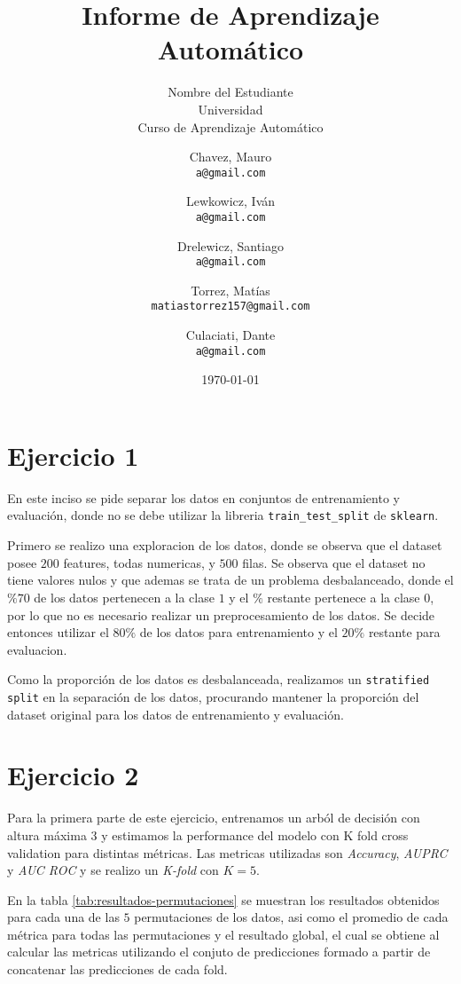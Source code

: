 \documentclass[12pt,a4paper]{article}
\title{Informe de Aprendizaje Automático}
\author{Nombre del Estudiante \\ Universidad \\ Curso de Aprendizaje Automático}
\author{
    Chavez, Mauro \\
    \texttt{a@gmail.com}
    \and
    Lewkowicz, Iván \\
    \texttt{a@gmail.com}
    \and
    Drelewicz, Santiago \\
    \texttt{a@gmail.com}
    \and
    Torrez, Matías \\
    \texttt{matiastorrez157@gmail.com}
    \and
    Culaciati, Dante \\
    \texttt{a@gmail.com}
}
\date{\today}
\begin{document}
\maketitle
\newpage
\tableofcontents
\newpage

\section{Ejercicio 1}
\par En este inciso se pide separar los datos en conjuntos de entrenamiento y evaluación, donde no se debe utilizar la libreria \texttt{train\_test\_split} de \texttt{sklearn}.

\par Primero se realizo una exploracion de los datos, donde se observa que el dataset posee $200$ features, todas numericas, y $500$ filas.
Se observa que el dataset no tiene valores nulos y que ademas se trata de un problema desbalanceado, donde el $\%70$ de los datos pertenecen a la clase $1$ y el $\%$ restante pertenece a la clase $0$, por lo que no es necesario realizar un preprocesamiento de los datos. 
Se decide entonces utilizar el $80\%$ de los datos para entrenamiento y el $20\%$ restante para evaluacion.

\par Como la proporción de los datos es desbalanceada, realizamos un \texttt{stratified split} en la separación de los datos, procurando mantener la proporción del dataset original para los datos de entrenamiento y evaluación. 


\section{Ejercicio 2}
\par Para la primera parte de este ejercicio, entrenamos un arból de decisión con altura máxima 3 y estimamos la performance del modelo con K fold cross validation para distintas métricas. 
Las metricas utilizadas son \textit{Accuracy}, \textit{AUPRC} y \textit{AUC ROC} y se realizo un \textit{K-fold} con $K=5$.
\par En la tabla \ref{tab:resultados-permutaciones} se muestran los resultados obtenidos para cada una de las $5$ permutaciones de los datos, asi como el promedio de cada métrica para todas las permutaciones y el resultado global,
el cual se obtiene al calcular las metricas utilizando el conjuto de predicciones formado a partir de concatenar las predicciones de cada fold.
\end{document}
